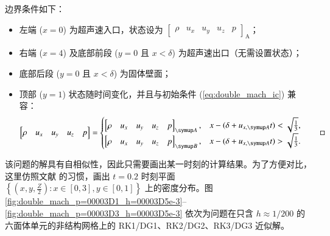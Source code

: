 \begin{problem}
边界条件如下：
\begin{itemize}
\item 左端 ($x=0$) 为超声速入口，状态设为 $\begin{bmatrix}\rho & u_{x} & u_{y} & u_{z} & p\end{bmatrix}_{\mathrm{A}}$；
\item 右端 ($x=4$) 及底部前段 ($y=0$ 且 $x<\delta$) 为超声速出口（无需设置状态）；
\item 底部后段 ($y=0$ 且 $x<\delta$) 为固体壁面；
\item 顶部 ($y=1$) 状态随时间变化，并且与初始条件 (\ref{eq:double_mach_ic}) 兼容：
\begin{equation}
\begin{bmatrix}\rho & u_{x} & u_{y} & u_{z} & p\end{bmatrix}=\begin{cases}
\begin{bmatrix}\rho & u_{x} & u_{y} & u_{z} & p\end{bmatrix}_{\mathrm{A}}, & x-(\delta+u_{x,\mathrm{A}}t)<\sqrt{\frac{1}{3}},\\
\begin{bmatrix}\rho & u_{x} & u_{y} & u_{z} & p\end{bmatrix}_{\mathrm{B}}, & x-(\delta+u_{x,\mathrm{A}}t)>\sqrt{\frac{1}{3}}.
\end{cases}\qedhere
\end{equation}
\end{itemize}
\end{problem}

该问题的解具有自相似性，因此只需要画出某一时刻的计算结果。为了方便对比，这里仿照文献 \cite{Woodward_1984,Zhong_2013,Zhu_2013}
的习惯，画出 $t=0.2$ 时刻平面 $\left\{ \left(x,y,\frac{Z}{2}\right):x\in[0,3],y\in[0,1]\right\} $
上的密度分布。图 \ref{fig:double_mach_p=00003D1_h=00003D5e-3}–\ref{fig:double_mach_p=00003D3_h=00003D5e-3}
依次为问题在只含 $h\approx1/200$
的六面体单元的非结构网格上的 RK1/DG1、RK2/DG2、RK3/DG3 近似解。

